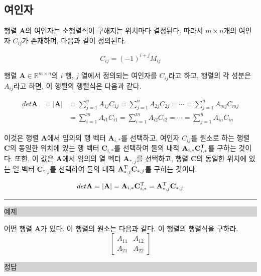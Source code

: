 \subsection{여인자}

행렬 $\mathbf A$의 여인자는 소행렬식이 구해지는 위치마다 결정된다.
따라서 $m \times n$개의 여인자 $C_{ij}$가 존재하며, 다음과 같이 정의된다.

$$C_{ij} = (-1)^{i+j} M_{ij}$$

행렬 $\mathbf A \in \mathbb R^{m \times n}$의 $i$ 행, $j$ 열에서 정의되는 여인자를 $C_{ij}$라고 하고, 행렬의 각 성분은 $A_{ij}$라고 하면,
이 행렬의 행렬식은 다음과 같다.

\begin{eqnarray}
det \mathbf A &= | \mathbf A | &= \sum_{j=1}^n A_{1j} C_{1j} = \sum_{j=1}^n A_{2j} C_{2j} = \cdots = \sum_{j=1}^n A_{mj} C_{mj} \\ \nonumber
& &= \sum_{i=1}^m A_{i1} C_{i1} = \sum_{i=1}^m A_{i2} C_{i2} = \cdots = \sum_{j=1}^n A_{in} C_{in} 
\end{eqnarray}

이것은 행렬 $\mathbf A$에서 임의의 행 벡터 $\mathbf A_{i,*}$를 선택하고, 여인자 $C_{ij}$를 원소로 하는 행렬 $\mathbf C$의 동일한 위치에 있는 행 벡터 $\mathbf C_{i,*}$를 선택하여 둘의 내적 $\mathbf A_{i,*} \mathbf C_{i,*}^{\rm T}$를 구하는 것이다.
또한, 이 값은 $\mathbf A$에서 임의의 열 벡터 $\mathbf A_{*,j}$를 선택하고, 행렬 $\mathbf C$의 동일한 위치에 있는 열 벡터 $\mathbf C_{*,j}$를 선택하여 둘의 내적 $\mathbf A_{*,j}^{\rm T} \mathbf C_{*,j}$를 구하는 것이다.

\begin{eqnarray}
det \mathbf A = | \mathbf A | = \mathbf A_{i,*} \mathbf C_{i,*}^{\rm T} = \mathbf A_{*,j}^{\rm T} \mathbf C_{*,j}
\end{eqnarray}

\hrule

\noindent \colorbox{lightgray}{\begin{minipage}{6cm}예제\end{minipage}} 


\noindent  어떤 행렬 $\mathbf A$가 있다. 이 행렬의 원소는 다음과 같다. 이 행렬의 행렬식을 구하라.
$$
\left [
\begin{array}{cc}
A_{11} & A_{12} \\
A_{21} & A_{22}
\end{array}
\right ]
$$

\noindent \colorbox{lightgray}{\begin{minipage}{6cm}정답\end{minipage}} 

